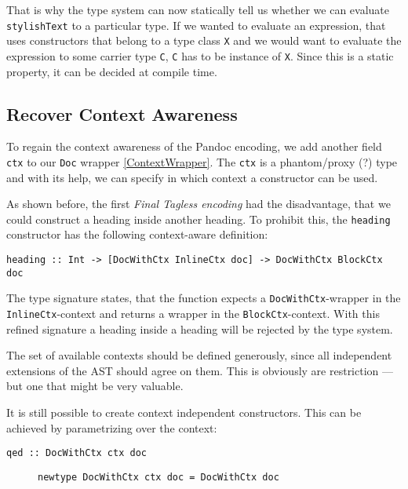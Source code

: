 \documentclass[format=acmsmall, review=true, screen=true]{acmart}
\begin{document}
That is why the type system can now statically tell us whether we can evaluate
\texttt{stylishText} to a particular type. If we wanted to evaluate an expression, that
uses constructors that belong to a type class \texttt{X} and we would want to evaluate
the expression to some carrier type \texttt{C}, \texttt{C} has to be instance of \texttt{X}. Since
this is a static property, it can be decided at compile time.


\subsection{Recover Context Awareness}
\label{sec:org5ba4b2b}

To regain the context awareness of the Pandoc encoding, we add another field
\texttt{ctx} to our \texttt{Doc} wrapper \ref{ContextWrapper}. The \texttt{ctx} is a
phantom/proxy (?) type and with its help, we can specify in which context a
constructor can be used.

As shown before, the first \emph{Final Tagless encoding} had the disadvantage, that
we could construct a heading inside another heading. To prohibit this, the
\texttt{heading} constructor has the following context-aware definition:

\begin{lstlisting}
heading :: Int -> [DocWithCtx InlineCtx doc] -> DocWithCtx BlockCtx doc
\end{lstlisting}

The type signature states, that the function expects a \texttt{DocWithCtx}-wrapper in
the \texttt{InlineCtx}-context and returns a wrapper in the \texttt{BlockCtx}-context. With
this refined signature a heading inside a heading will be rejected by the type
system.

The set of available contexts should be defined generously, since all
independent extensions of the AST should agree on them. This is obviously are
restriction — but one that might be very valuable.

It is still possible to create context independent constructors. This can be
achieved by parametrizing over the context:

\begin{lstlisting}
qed :: DocWithCtx ctx doc
\end{lstlisting}

\begin{figure}[t]
\begin{lstlisting}
newtype DocWithCtx ctx doc = DocWithCtx doc
\end{lstlisting}
\end{figure}
\end{document}
